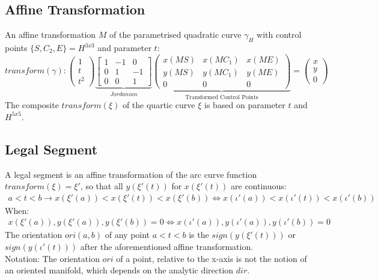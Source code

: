 \documentclass{report}
\begin{document}
\subsection{Affine Transformation}
An affine transformation $M$ of the parametrised quadratic curve $\gamma_{H}$ with control points $\{S,C_{2},E\} = H^{3x3}$ and parameter $t$:
\begin{equation}
transform(\gamma):
\begin{pmatrix}
1 \\
t \\
t^2
\end{pmatrix}
\underbrace{\begin{bmatrix}
1 & -1 & 0\\
0 & 1 & -1\\
0 & 0 &1
\end{bmatrix}}_{Jordanian}
\underbrace{\begin{pmatrix}
x(MS) & x(MC_{1}) & x(ME) \\
y(MS) & y(MC_{1}) & y(ME) \\
0 & 0 & 0
\end{pmatrix}}_{\text{Transformed Control Points}}
=
\begin{pmatrix}
x \\
y \\
0
\end{pmatrix}
\end{equation}
The composite $transform(\xi)$ of the quartic curve $\xi$ is based on parameter $t$ and $H^{5x5}$. ~\cite[Spline\_Axioms.tex]{Analyzer}

\subsection{Legal Segment}
A legal segment is an affine transformation of the arc curve function $transform(\xi) = \xi'$, so that all $y(\xi'(t))$ for $x(\xi'(t))$ are continuous:
\begin{align}
a<t<b\rightarrow x(\xi'(a))<x(\xi'(t))<x(\xi'(b)) \Leftrightarrow x(\iota'(a))<x(\iota'(t))<x(\iota'(b))
\end{align}
When:
\begin{align}
x(\xi'(a)),y(\xi'(a)), y(\xi'(b)) = 0 \Leftrightarrow x(\iota'(a)),y(\iota'(a)), y(\iota'(b)) = 0
\end{align}
The orientation $ori(a,b)$ of any point $a < t < b$ is the $sign(y(\xi'(t)))$ or $sign(y(\iota'(t)))$ after the aforementioned affine transformation.\\
Notation: The orientation $ori$ of a point, relative to the x-axis is not the notion of an oriented manifold, which depends on the analytic direction $dir$.
\end{document}
